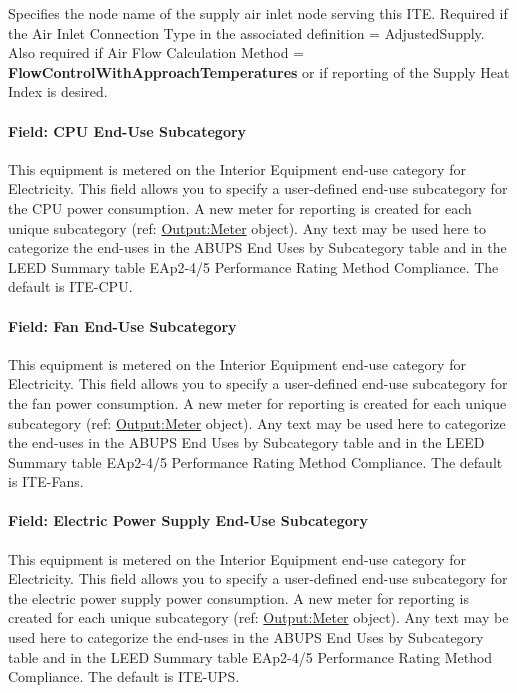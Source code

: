 Specifies the node name of the supply air inlet node serving this ITE. Required if the Air Inlet Connection Type in the associated definition = AdjustedSupply. Also required if Air Flow Calculation Method = \textbf{FlowControlWithApproachTemperatures} or if reporting of the Supply Heat Index is desired.

\paragraph{Field: CPU End-Use Subcategory}\label{field-cpu-end-use-subcategory-ite-instance}

This equipment is metered on the Interior Equipment end-use category for Electricity. This field allows you to specify a user-defined end-use subcategory for the CPU power consumption. A new meter for reporting is created for each unique subcategory (ref: \hyperref[outputmeter-and-outputmetermeterfileonly]{Output:Meter} object). Any text may be used here to categorize the end-uses in the ABUPS End Uses by Subcategory table and in the LEED Summary table EAp2-4/5 Performance Rating Method Compliance. The default is ITE-CPU.

\paragraph{Field: Fan End-Use Subcategory}\label{field-fan-end-use-subcategory-ite-instance}

This equipment is metered on the Interior Equipment end-use category for Electricity. This field allows you to specify a user-defined end-use subcategory for the fan power consumption. A new meter for reporting is created for each unique subcategory (ref: \hyperref[outputmeter-and-outputmetermeterfileonly]{Output:Meter} object). Any text may be used here to categorize the end-uses in the ABUPS End Uses by Subcategory table and in the LEED Summary table EAp2-4/5 Performance Rating Method Compliance. The default is ITE-Fans.

\paragraph{Field: Electric Power Supply End-Use Subcategory}\label{field-electric-power-supply-end-use-subcategory-ite-instance}

This equipment is metered on the Interior Equipment end-use category for Electricity. This field allows you to specify a user-defined end-use subcategory for the electric power supply power consumption. A new meter for reporting is created for each unique subcategory (ref: \hyperref[outputmeter-and-outputmetermeterfileonly]{Output:Meter} object). Any text may be used here to categorize the end-uses in the ABUPS End Uses by Subcategory table and in the LEED Summary table EAp2-4/5 Performance Rating Method Compliance. The default is ITE-UPS.

